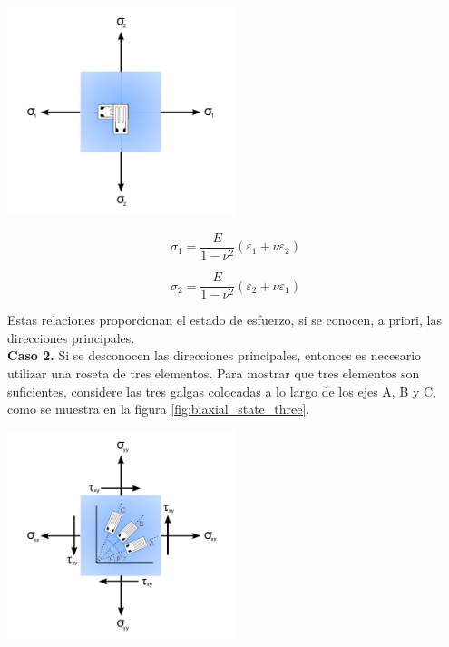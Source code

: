\begin{center}
\includegraphics[width=0.5\textwidth]{src/ch2/biaxial_state.pdf}
\label{fig:biaxial_state}
\end{center}

\begin{equation}\label{eq:principal_stress_1}
\sigma_1 = \frac{E}{1-\nu^2} \left( \varepsilon_1 + \nu\varepsilon_2 \right)
\end{equation}

\begin{equation}\label{eq:principal_stress_2}
\sigma_2 = \frac{E}{1-\nu^2} \left( \varepsilon_2 + \nu\varepsilon_1 \right)
\end{equation}

Estas relaciones proporcionan el estado de esfuerzo, si se conocen, a priori, las direcciones 
principales. \\

\textbf{Caso 2.} Si se desconocen las direcciones principales, entonces es necesario utilizar 
una roseta de tres elementos. Para mostrar que tres elementos son suficientes, considere las 
tres galgas colocadas a lo largo de los ejes A, B y C, como se muestra en la figura 
\ref{fig:biaxial_state_three}.

\begin{center}
\includegraphics[width=0.5\textwidth]{src/ch2/biaxial_state_three.pdf}
\label{fig:biaxial_state_three}
\end{center}

